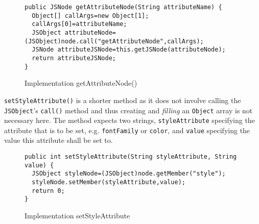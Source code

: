 \begin{figure}[htbp]
 \begin{verbatim}
public JSNode getAttributeNode(String attributeName) {
  Object[] callArgs=new Object[1];
  callArgs[0]=attributeName;
  JSObject attributeNode=(JSObject)node.call("getAttributeNode",callArgs);
  JSNode attributeJSNode=this.getJSNode(attributeNode);
  return attributeJSNode;
}
 \end{verbatim}
	\caption{Implementation getAttributeNode()}
	\label{fig:ImplementationGetAttributeNode}
\end{figure}

\texttt{setStyleAttribute()} is a shorter method as it does not involve calling the \texttt{JSObject}'s \texttt{call()} method and thus creating and \emph{filling} an \texttt{Object} array is not necessary here. The method expects two strings, \texttt{styleAttribute} specifying the attribute that is to be set, e.g. \texttt{fontFamily} or \texttt{color}, and \texttt{value} specifying the value this attribute shall be set to.

\begin{figure}[htbp]
	\begin{verbatim}
public int setStyleAttribute(String styleAttribute, String value) {
  JSObject styleNode=(JSObject)node.getMember("style");
  styleNode.setMember(styleAttribute,value);
  return 0;
}
	\end{verbatim}
	\caption{Implementation setStyleAttribute}
	\label{fig:ImplementationSetStyleAttribute}
\end{figure}